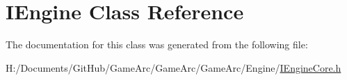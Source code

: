 \hypertarget{class_i_engine}{\section{I\+Engine Class Reference}
\label{class_i_engine}
}


The documentation for this class was generated from the following file\+:\begin{DoxyCompactItemize}
\item 
H\+:/\+Documents/\+Git\+Hub/\+Game\+Arc/\+Game\+Arc/\+Game\+Arc/\+Engine/\hyperlink{_i_engine_core_8h}{I\+Engine\+Core.\+h}\end{DoxyCompactItemize}
